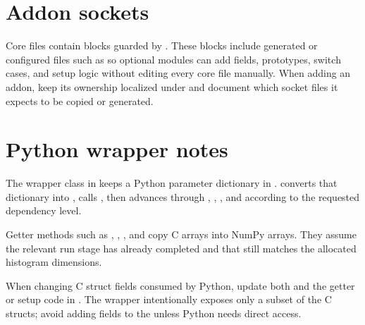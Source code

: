 \documentclass[letterpaper,10pt,english]{sphinxmanual}
\begin{document}
\section{Add\sphinxhyphen{}on sockets}
\label{\detokenize{code_structure:add-on-sockets}}
\sphinxAtStartPar
Core files contain  blocks guarded by . These
blocks include generated or configured files such as  so optional
modules can add fields, prototypes, switch cases, and setup logic without
editing every core file manually. When adding an add\sphinxhyphen{}on, keep its ownership
localized under  and document which socket files it expects to
be copied or generated.


\section{Python wrapper notes}
\label{\detokenize{code_structure:python-wrapper-notes}}
\sphinxAtStartPar
The wrapper class  in  keeps a Python parameter
dictionary in .  converts that dictionary into
, calls , then advances through
, , , and
 according to the requested dependency level.

\sphinxAtStartPar
Getter methods such as , , , and
 copy C arrays into NumPy arrays. They assume the relevant
run stage has already completed and that  still matches the
allocated histogram dimensions.

\sphinxAtStartPar
When changing C struct fields consumed by Python, update both
 and the getter or setup code in .
The wrapper intentionally exposes only a subset of the C structs; avoid adding
fields to the  unless Python needs direct access.
\end{document}
